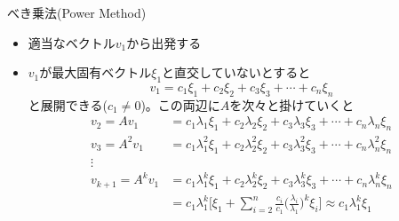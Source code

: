\begin{frame}[t,fragile]{べき乗法(Power Method)}
  \begin{itemize}
  \item 適当なベクトル$v_1$から出発する
  \item $v_1$が最大固有ベクトル$\xi_1$と直交していないとすると
    \[
    v_1 = c_1 \xi_1 + c_2 \xi_2 + c_3 \xi_3 + \cdots + c_n \xi_n
    \]
    と展開できる($c_1 \ne 0$)。この両辺に$A$を次々と掛けていくと
    \begin{align*}
      v_2 = A v_1 &= c_1 \lambda_1 \xi_1 + c_2 \lambda_2 \xi_2 + c_3 \lambda_3 \xi_3 + \cdots + c_n \lambda_n \xi_n \\
      v_3 = A^2 v_1 &= c_1 \lambda_1^2 \xi_1 + c_2 \lambda_2^2 \xi_2 + c_3 \lambda_3^2 \xi_3 + \cdots + c_n \lambda_n^2 \xi_n \\
      \vdots \\
      v_{k+1} = A^k v_1 &= c_1 \lambda_1^k \xi_1 + c_2 \lambda_2^k \xi_2 + c_3 \lambda_3^k \xi_3 + \cdots + c_n \lambda_n^k \xi_n \\
      &= c_1 \lambda_1^k \Big[ \xi_1 + \sum_{i=2}^n \frac{c_i}{c_1} \big( \frac{\lambda_i}{\lambda_1}\big)^k \xi_i \Big] \approx c_1 \lambda_1^k \xi_1 \\
    \end{align*}
  \end{itemize}
\end{frame}
